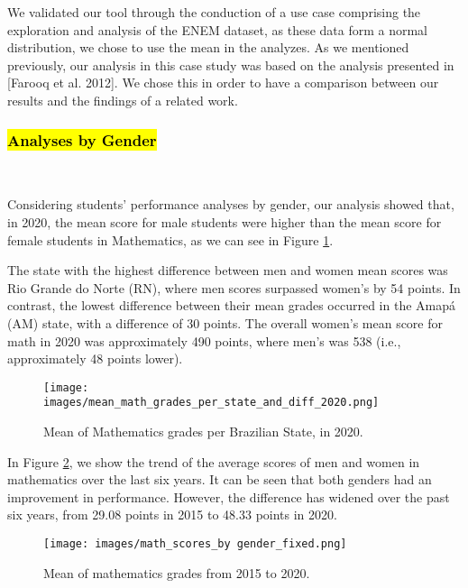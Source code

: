 \documentclass[12pt]{article}
\begin{document}

We validated our tool through the conduction of a use case comprising the exploration and analysis of the ENEM dataset, as these data form a normal distribution, we chose to use the mean in the analyzes. As we mentioned previously, our analysis in this case study was based on the analysis presented in [Farooq et al. 2012]. We chose this in order to have a comparison between our results and the findings of a related work.

\subsubsection{\hl{Analyses by Gender}}\

Considering students' performance analyses by gender, our analysis showed that, in 2020, the mean score for male students were higher than the mean score for female students in Mathematics, as we can see in Figure \ref{gender}. 

The state with the highest difference between men and women mean scores was Rio Grande do Norte (RN), where men scores surpassed women's by 54 points. In contrast, the lowest difference between their mean grades occurred in the Amapá (AM) state, with a difference of 30 points. The overall women's mean score for math in 2020 was approximately 490 points, where men's was 538 (i.e., approximately 48 points lower). 

\begin{figure}[h!]
\centerline{\texttt{[image: images/mean\_math\_grades\_per\_state\_and\_diff\_2020.png]}}
\caption{Mean of Mathematics grades per Brazilian State, in 2020.} 
\label{gender}
\end{figure}

In Figure \ref{math_scores}, we show the trend of the average scores of men and women in mathematics over the last six years. It can be seen that both genders had an improvement in performance. However, the difference has widened over the past six years, from  29.08 points in 2015 to 48.33 points in 2020.

\begin{figure}[h!]
\centerline{\texttt{[image: images/math\_scores\_by gender\_fixed.png]}}
\caption{Mean of mathematics grades from 2015 to 2020.} 
\label{math_scores}
\end{figure}
\end{document}
